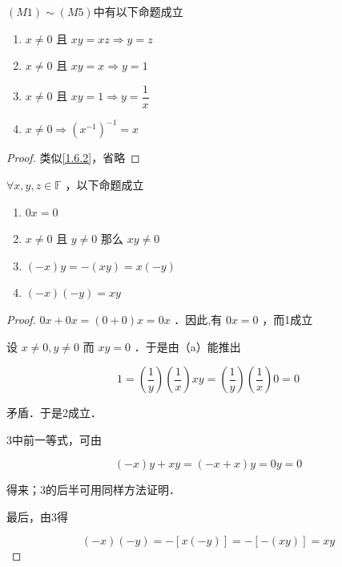 \begin{proposition}
	$(M1)\sim(M5)$中有以下命题成立
	\begin{enumerate}
		\item $x \neq 0$ 且 $x y=x z \Rightarrow y=z$
		\item$x \neq 0$ 且 $x y=x \Rightarrow y=1$
		\item$x \neq 0$ 且 $x y=1 \Rightarrow y=\dfrac{1}{x}$
		\item $x \neq 0 \Rightarrow\left(x^{-1}\right)^{-1}=x$
	\end{enumerate}
	
\end{proposition}
\begin{proof}
	类似\ref{1.6.2}，省略
\end{proof}
\begin{proposition}\label{1.6.4}
	$\forall x, y, z \in \mathbb{F}$ ，以下命题成立
	\begin{enumerate}
		\item  $0 x=0$
		\item $x \neq 0$ 且 $y \neq 0$ 那么 $x y \neq 0$
		\item $(-x) y=-(x y)=x(-y)$
		\item $(-x)(-y)=x y$
	\end{enumerate} 
\end{proposition}
\begin{proof}
	$0 x+0 x=(0+0) x=0 x$ ．因此,有 $0 x=0$ ，而1成立
	
	
	设 $x \neq 0, y \neq 0$ 而 $x y=0$ ．于是由（a）能推出
	
	$$
	1=\left(\dfrac{1}{y}\right)\left(\dfrac{1}{x}\right) x y=\left(\dfrac{1}{y}\right)\left(\dfrac{1}{x}\right) 0=0
	$$
	
	
	矛盾．于是2成立．
	
	
	3中前一等式，可由
	
	$$
	(-x) y+x y=(-x+x) y=0 y=0
	$$
	
	
	得来；3的后半可用同样方法证明．
	
	最后，由3得
	
	$$
	(-x)(-y)=-[x(-y)]=-[-(x y)]=x y 
	$$
\end{proof}





